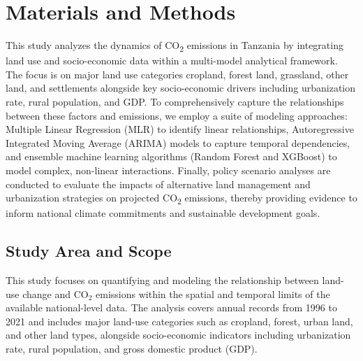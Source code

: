 \documentclass[10pt,letterpaper]{article}
\begin{document}
\section{Materials and Methods}
\label{sec:methods}



This study analyzes the dynamics of CO\textsubscript{2} emissions in Tanzania by integrating land use and socio-economic data within a multi-model analytical framework. The focus is on major land use categories cropland, forest land, grassland, other land, and settlements alongside key socio-economic drivers including urbanization rate, rural population, and GDP. To comprehensively capture the relationships between these factors and emissions, we employ a suite of modeling approaches: Multiple Linear Regression (MLR) to identify linear relationships, Autoregressive Integrated Moving Average (ARIMA) models to capture temporal dependencies, and ensemble machine learning algorithms (Random Forest and XGBoost) to model complex, non-linear interactions. Finally, policy scenario analyses are conducted to evaluate the impacts of alternative land management and urbanization strategies on projected CO\textsubscript{2} emissions, thereby providing evidence to inform national climate commitments and sustainable development goals.

%
\subsection{Study Area and Scope}

This study focuses on quantifying and modeling the relationship between land-use change and CO$_2$ emissions within the spatial and temporal limits of the available national-level data. The analysis covers annual records from 1996 to 2021 and includes major land-use categories such as cropland, forest, urban land, and other land types, alongside socio-economic indicators including urbanization rate, rural population, and gross domestic product (GDP).
\end{document}
